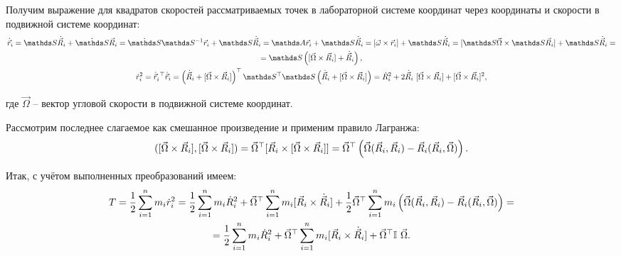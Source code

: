 Получим выражение для квадратов скоростей рассматриваемых точек в лабораторной системе координат через координаты и скорости в подвижной системе координат:
\vspace*{-0.1cm}
\begin{gather}
\dot{\vec{r}}_i = \bbS \dot{\vec{R}}_i + \dot{\bbS} \vec{R}_i = \dot{\bbS} \bbS^{-1} \vec{r}_i + \bbS \dot{\vec{R}}_i  = \bbA \vec{r}_i + \bbS \dot{\vec{R}}_i = [ \vec{\omega} \times \vec{r}_i ] + \bbS \dot{\vec{R}}_i = [\bbS \vec{\Omega} \times \bbS \vec{R}_i ] + \bbS \dot{\vec{R}}_i = \notag \\
= \bbS \left( [\vec{\Omega} \times \vec{R}_i ] + \dot{\vec{R}}_i \right)  \notag , \\
\dot{r}_i^2 = \dot{\vec{r}}_i^{\ \top} \dot{\vec{r}}_i = \left( \dot{\vec{R}}_i + [ \vec{\Omega} \times \vec{R}_i] \right)^\top \bbS^\top \bbS \left( \dot{\vec{R}}_i + [ \vec{\Omega} \times \vec{R}_i ] \right) = \dot{R}_i^2 + 2 \dot{\vec{R}}_i \ [ \vec{\Omega} \times \vec{R}_i] + [ \vec{\Omega} \times \vec{R}_i ]^2 \notag ,
\end{gather}

\hspace*{-0.75cm} где $\vec{\Omega}$ -- вектор угловой скорости в подвижной системе координат.

Рассмотрим последнее слагаемое как смешанное произведение и применим правило Лагранжа:
\vspace*{-0.1cm}
\begin{gather}
([\vec{\Omega} \times \vec{R}_i] , [\vec{\Omega} \times \vec{R}_i]) = \vec{\Omega}^\top [ \vec{R}_i \times [ \vec{\Omega} \times \vec{R}_i ]] = \vec{\Omega}^\top \left( \vec{\Omega} (\vec{R}_i, \vec{R}_i ) - \vec{R}_i (\vec{R}_i, \vec{\Omega} ) \right)
\notag .
\end{gather}

Итак, с учётом выполненных преобразований имеем:
\vspace*{-0.1cm}
\begin{gather}
T = \frac{1}{2} \sum_{i=1}^{n} m_i \dot{r}_i^2 = \frac{1}{2} \sum_{i=1}^{n} m_i \dot{R}_i^2 + \vec{\Omega} ^\top \sum_{i=1}^{n} m_i[ \vec{R}_i \times \dot{\vec{R}}_i ] + \frac{1}{2} \vec{\Omega}^\top \sum_{i=1}^{n} m_i \left( \vec{\Omega} (\vec{R}_i, \vec{R}_i ) - \vec{R}_i (\vec{R}_i, \vec{\Omega} ) \right) = 
\notag \\
= \frac{1}{2} \sum_{i=1}^{n} m_i \dot{R}_i^2 + \vec{\Omega}^\top \sum_{i=1}^{n} m_i [ \vec{R}_i \times \dot{\vec{R}}_i ] + \vec{\Omega}^\top \mathbb{I} \ \vec{\Omega} \notag .
\end{gather}

